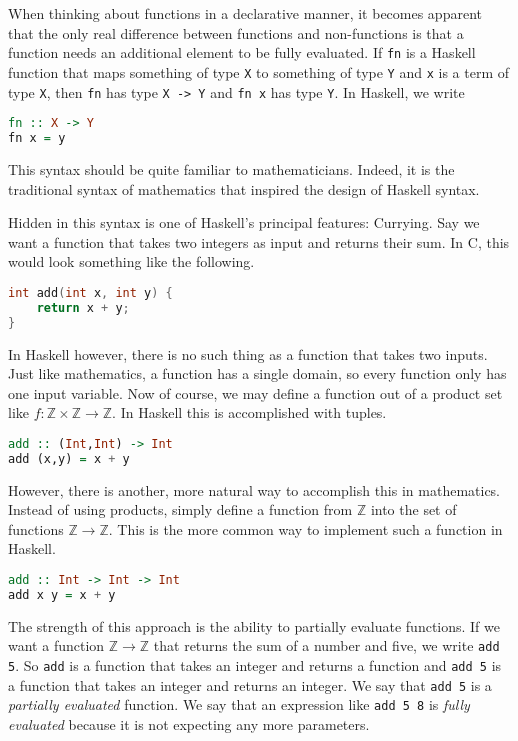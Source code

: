 \documentclass[MS, xcolor=dvipsnames]{wfuthesis}
\def\bZ{\mathbb{Z}}
\theoremstyle{definition}
\begin{document}
When thinking about functions in a declarative manner, it becomes apparent that the only real difference between functions and non-functions is that a function needs an additional element to be fully evaluated. If \lstinline{fn} is a Haskell function that maps something of type \lstinline{X} to something of type \lstinline{Y} and \lstinline{x} is a term of type \lstinline{X}, then \lstinline{fn} has type \lstinline{X -> Y} and \lstinline{fn x} has type \lstinline{Y}. In Haskell, we write
\begin{lstlisting}[language=Haskell]
fn :: X -> Y
fn x = y
\end{lstlisting}
This syntax should be quite familiar to mathematicians. Indeed, it is the traditional syntax of mathematics that inspired the design of Haskell syntax. \par
Hidden in this syntax is one of Haskell's principal features: Currying. Say we want a function that takes two integers as input and returns their sum. In C, this would look something like the following.
\begin{lstlisting}[language=C]
int add(int x, int y) {
    return x + y;
}
\end{lstlisting}
In Haskell however, there is no such thing as a function that takes two inputs. Just like mathematics, a function has a single domain, so every function only has one input variable. Now of course, we may define a function out of a product set like $f: \bZ \times \bZ \to \bZ$. In Haskell this is accomplished with tuples.
\begin{lstlisting}[language=Haskell]
add :: (Int,Int) -> Int
add (x,y) = x + y
\end{lstlisting}
However, there is another, more natural way to accomplish this in mathematics. Instead of using products, simply define a function from $\bZ$ into the set of functions $\bZ \to \bZ$. This is the more common way to implement such a function in Haskell.
\begin{lstlisting}[language=Haskell]
add :: Int -> Int -> Int
add x y = x + y
\end{lstlisting}
The strength of this approach is the ability to partially evaluate functions. If we want a function $\bZ \to \bZ$ that returns the sum of a number and five, we write \lstinline{add 5}. So \lstinline{add} is a function that takes an integer and returns a function and \lstinline{add 5} is a function that takes an integer and returns an integer. We say that \lstinline{add 5} is a \emph{partially evaluated} function. We say that an expression like \lstinline{add 5 8} is \emph{fully evaluated} because it is not expecting any more parameters. \par
\end{document}
